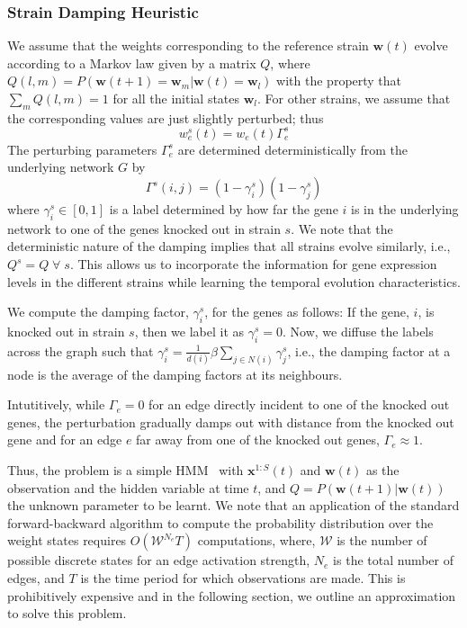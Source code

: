 \documentclass{bioinfo}
\begin{document}
\begin{methods}
\subsubsection{Strain Damping Heuristic } 
We assume that the weights corresponding to the reference strain
$\mathbf{w}(t)$ evolve according to a Markov law given by a matrix $Q$,
where $Q(l, m) = P(\mathbf{w}(t+1) = \mathbf{w}_{m} | {\mathbf w}(t)
= \mathbf{w}_{l})$ with the property that $\sum_{m} Q(l, m) = 1$ for
all the initial states $\mathbf{w}_{l}$. For other strains, we assume
that the corresponding values are just slightly perturbed; thus
\begin{equation}
  \label{eq:damping}
 w^s_e(t) = w_e(t) \Gamma^s_e
\end{equation}
The perturbing parameters $\Gamma^s_e$ are determined
deterministically from the underlying network $G$ by
\begin{equation}
  \label{eq:edge-damping}
\Gamma^s(i,j) = (1 - \gamma^s_i)(1 - \gamma^s_j)  
\end{equation}
where $\gamma^s_i \in [0,1]$ is a label determined by how far the gene
$i$ is in the underlying network to one of the genes knocked out in
strain $s$. We note that the deterministic nature of the damping
implies that all strains evolve similarly, i.e., $Q^{s} = Q\;
\forall \; s$. This allows us to incorporate the information for gene
expression levels in the different strains while learning the temporal
evolution characteristics. 


We compute the damping factor, $\gamma^s_i$, for the genes
as follows: If the gene, $i$, is knocked out in strain $s$, then we
label it as $\gamma^s_i=0$. Now, we diffuse the labels across the
graph  such that $\gamma^{s}_i = \frac{1}{d(i)} \beta
\sum_{j\in N(i)} \gamma_j^s$, i.e., the damping factor at a node is
the average of the damping factors at its neighbours.    

 Intutitively, while $\Gamma_e = 0$ for an edge 
directly incident to one of the knocked out genes, the perturbation
gradually damps out with distance from the knocked out gene and for
an edge $e$ far away from one of the knocked out genes, $\Gamma_e
\approx 1$.

Thus, the problem is a simple HMM~\cite{Rabiner89hmm} with
$\mathbf{x}^{1:S}(t)$ and $\mathbf{w}(t)$ as the observation and  the
hidden variable at time $t$, and $Q=P(\mathbf{w}(t+1)| \mathbf{w}(t))$
the unknown parameter to be learnt. 
We note that an application of the standard forward-backward algorithm
to compute the probability distribution over the weight states
requires $O({\mathcal W}^{N_{e}}T)$ computations, where, ${\mathcal
  W}$ is the number of possible discrete states for an edge activation
strength, $N_{e}$ is the total number of edges, and $T$ is the time
period for which observations are made.  This is prohibitively
expensive and in the following section, we outline an approximation to
solve this problem.


\end{methods}
\end{document}
